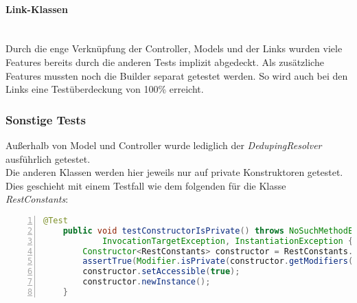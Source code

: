 \paragraph{Link-Klassen}\mbox{}\\
Durch die enge Verknüpfung der Controller, Models und der Links wurden viele Features bereits durch die anderen Tests implizit abgedeckt. Als zusätzliche Features mussten noch die Builder separat getestet werden.
So wird auch bei den Links eine Testüberdeckung von 100\% erreicht.

\subsubsection{Sonstige Tests}
Außerhalb von Model und Controller wurde lediglich der \textit{DedupingResolver} ausführlich getestet.
\\
Die anderen Klassen werden hier jeweils nur auf private Konstruktoren getestet.
Dies geschieht mit einem Testfall wie dem folgenden für die Klasse \textit{RestConstants}:
\begin{lstlisting}[language=java,
    basicstyle=\normalfont\ttfamily,
    numbers=left,
    numberstyle=\scriptsize,
    stepnumber=1,
    numbersep=8pt,
    showstringspaces=false,
    breaklines=true,
    frame=lines,
    backgroundcolor=\color{background}]
    @Test
    public void testConstructorIsPrivate() throws NoSuchMethodException, IllegalAccessException,
            InvocationTargetException, InstantiationException {
        Constructor<RestConstants> constructor = RestConstants.class.getDeclaredConstructor();
        assertTrue(Modifier.isPrivate(constructor.getModifiers()));
        constructor.setAccessible(true);
        constructor.newInstance();
    }
\end{lstlisting}
